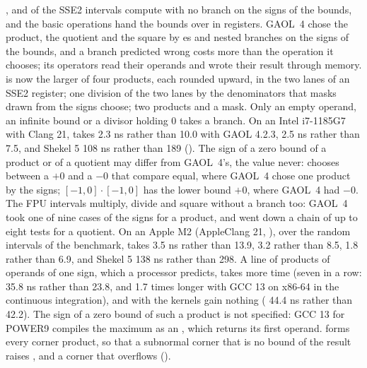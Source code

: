 \documentclass[12pt,a4paper,twoside,openright]{book}
\begin{document}
\medskip
\code{*}, \code{/} and  of the SSE2 intervals compute with no
branch on the signs of the bounds, and the basic operations hand the bounds
over in registers.\newinvfive{} GAOL~4 chose the product, the quotient and
the square by es and nested branches on the signs of the bounds,
and a branch predicted wrong costs more than the operation it chooses; its
operators read their operands and wrote their result through memory.
 is now the larger of four products, each rounded upward, in the
two lanes of an SSE2 register;  one division of the two lanes by
the denominators that masks drawn from the signs choose;  two
products and a mask. Only an empty operand, an infinite bound or a divisor
holding 0 takes a branch. On an Intel i7-1185G7 with Clang 21, 
takes 2.3 ns rather than 10.0 with GAOL 4.2.3,  2.5 ns rather
than 7.5, and Shekel 5 108 ns rather than 189 (). The
sign of a zero bound of a product or of a quotient may differ from GAOL~4's,
the value never:  chooses between a $+0$ and a $-0$ that compare
equal, where GAOL~4 chose one product by the signs; $[-1, 0] \cdot [-1, 0]$
has the lower bound $+0$, where GAOL~4 had $-0$. The FPU intervals multiply,
divide and square without a branch too: GAOL~4 took one of nine cases of the
signs for a product, and went down a chain of up to eight tests for a
quotient. On an Apple M2 (AppleClang 21, ), over the
random intervals of the benchmark,  takes 3.5 ns rather than
13.9,  3.2 rather than 8.5,  1.8 rather than 6.9,
and Shekel 5 138 ns rather than 298. A line of products of operands of one
sign, which a processor predicts, takes more time (seven \code{*} in a row:
35.8 ns rather than 23.8, and 1.7 times longer with GCC 13 on x86-64 in the
continuous integration), and with  the kernels
gain nothing ( 44.4 ns rather than 42.2). The sign of a zero
bound of such a product is not specified: GCC 13 for POWER9 compiles the
maximum as an , which returns its first operand. 
forms every corner product, so that a subnormal corner that is no bound of
the result raises , and a corner that overflows
 ().
\end{document}
